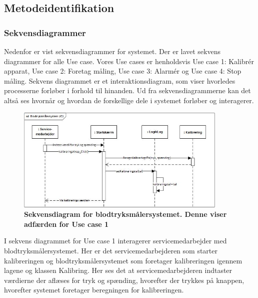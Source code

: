 \subsection{Metodeidentifikation}
\subsubsection{Sekvensdiagrammer}
Nedenfor er vist sekvensdiagrammer for systemet. Der er lavet sekvens diagrammer for alle Use case. Vores Use cases er henholdsvis Use case 1: Kalibrér apparat, Use case 2: Foretag måling, Use case 3: Alarmér og Use case 4: Stop måling. Sekvens diagrammet er et interaktionsdiagram, som viser hvorledes processerne forløber i forhold til hinanden. Ud fra sekvensdiagrammerne kan det altså ses hvornår og hvordan de forskellige dele i systemet forløber og interagerer. \\
\begin{figure}[H]
\includegraphics[width =0.9\textwidth , center]{billeder/sdUC1}
\caption{\textbf{Sekvensdiagram for blodtryksmålersystemet. Denne viser adfærden for Use case 1 }}
\end{figure}
I sekvens diagrammet for Use case 1 interagerer servicemedarbejder med blodtryksmålersystemet. Her er det servicemedarbejderen som starter kalibreringen og blodtryksmålersystemet som foretager kalibreringen igennem lagene og klassen Kalibring. Her ses det at servicemedarbejderen indtaster værdierne der aflæses for tryk og spænding, hvorefter der trykkes på knappen, hvorefter systemet foretager beregningen for kalibreringen. 
